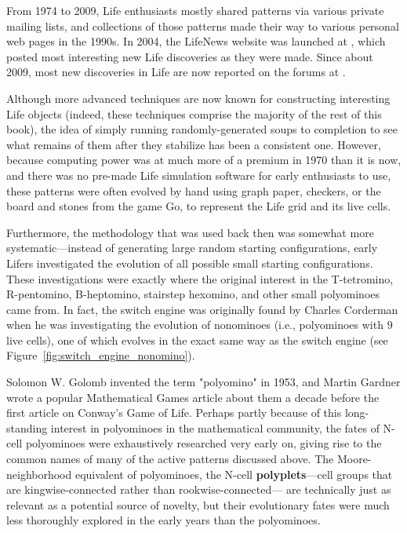 From 1974 to 2009, Life enthusiasts mostly shared patterns via various private mailing lists, and collections of those patterns made their way to various personal web pages in the 1990s. In 2004, the LifeNews website was launched at , which posted most interesting new Life discoveries as they were made. Since about 2009, most new discoveries in Life are now reported on the forums at .

Although more advanced techniques are now known for constructing interesting Life objects (indeed, these techniques comprise the majority of the rest of this book), the idea of simply running randomly-generated soups to completion to see what remains of them after they stabilize has been a consistent one. However, because computing power was at much more of a premium in 1970 than it is now, and there was no pre-made Life simulation software for early enthusiasts to use, these patterns were often evolved by hand using graph paper, checkers, or the board and stones from the game Go, to represent the Life grid and its live cells.

Furthermore, the methodology that was used back then was somewhat more systematic---instead of generating large random starting configurations, early Lifers investigated the evolution of all possible small starting configurations. These investigations were exactly where the original interest in the T-tetromino, R-pentomino, B-heptomino, stairstep hexomino, and other small polyominoes came from. In fact, the switch engine was originally found by Charles Corderman when he was investigating the evolution of nonominoes (i.e., polyominoes with $9$ live cells), one of which evolves in the exact same way as the switch engine (see Figure~\ref{fig:switch_engine_nonomino}).

Solomon W. Golomb invented the term "polyomino" in 1953, and Martin Gardner wrote a popular Mathematical Games article about them a decade before the first article on Conway's Game of Life. Perhaps partly because of this long-standing interest in polyominoes in the mathematical community, the fates of N-cell polyominoes were exhaustively researched very early on, giving rise to the common names of many of the active patterns discussed above.  The Moore-neighborhood equivalent of polyominoes, the N-cell \textbf{polyplets}---cell groups that are kingwise-connected rather than rookwise-connected--- are technically just as relevant as a potential source of novelty, but their evolutionary fates were much less thoroughly explored in the early years than the polyominoes.

